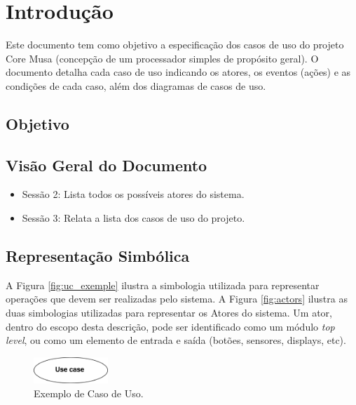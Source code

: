 \documentclass{article}
\begin{document}
\newpage

\tableofcontents
\newpage

\section{Introdução}
Este documento tem como objetivo a especificação dos casos de uso do projeto Core Musa (concepção de um processador simples de propósito geral). O documento detalha cada caso de uso indicando os atores, os eventos (ações) e as condições de cada caso, além dos diagramas de casos de uso.

  \subsection{Objetivo}
  
  \subsection{Visão Geral do Documento}
  \begin{itemize}
    \item Sessão 2: Lista todos os possíveis atores do sistema.
    \item Sessão 3: Relata a lista dos casos de uso do projeto.
  \end{itemize}
  
  \subsection{Representação Simbólica}
  A Figura \ref{fig:uc_exemple} ilustra a simbologia utilizada para representar operações que devem ser realizadas pelo sistema. A Figura \ref{fig:actors} ilustra as duas simbologias utilizadas para representar os Atores do sistema. Um ator, dentro do escopo desta descrição, pode ser identificado como um módulo \textit{top level}, ou como um elemento de entrada e saída (botões, sensores, displays, etc).
  
  \FloatBarrier
  \begin{figure}[H]
    \centering
    \includegraphics[width=0.25\textwidth]{uc_exemple.png}
    \caption{Exemplo de Caso de Uso.}
    \label{uc_exemple}
  \end{figure}  
  
\end{document}
